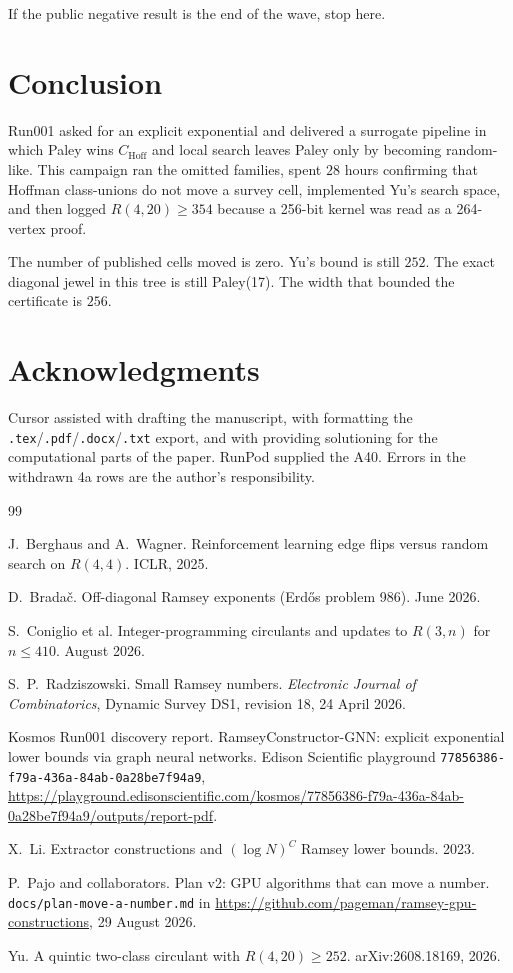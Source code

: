\documentclass[11pt,a4paper]{article}
\begin{document}
If the public negative result is the end of the wave, stop here.

\section{Conclusion}

Run001 asked for an explicit exponential and delivered a surrogate
pipeline in which Paley wins $C_{\mathrm{Hoff}}$ and local search
leaves Paley only by becoming random-like. This campaign ran the
omitted families, spent $28$ hours confirming that Hoffman class-unions
do not move a survey cell, implemented Yu's search space, and then
logged $R(4,20)\ge 354$ because a 256-bit kernel was read as a
264-vertex proof.

The number of published cells moved is zero. Yu's bound is still $252$.
The exact diagonal jewel in this tree is still Paley(17). The width
that bounded the certificate is $256$.

\section*{Acknowledgments}

Cursor assisted with drafting the manuscript, with formatting the
\texttt{.tex}/\texttt{.pdf}/\texttt{.docx}/\texttt{.txt} export, and
with providing solutioning for the computational parts of the paper.
RunPod supplied the A40. Errors in the withdrawn 4a rows are the
author's responsibility.

\begin{thebibliography}{99}

J.~Berghaus and A.~Wagner.
Reinforcement learning edge flips versus random search on $R(4,4)$.
ICLR, 2025.

D.~Brada\v{c}.
Off-diagonal Ramsey exponents (Erd\H{o}s problem 986).
June 2026.

S.~Coniglio et al.
Integer-programming circulants and updates to $R(3,n)$ for $n\le 410$.
August 2026.

S.~P.~Radziszowski.
Small Ramsey numbers.
\textit{Electronic Journal of Combinatorics}, Dynamic Survey DS1,
revision 18, 24 April 2026.

Kosmos Run001 discovery report.
RamseyConstructor-GNN: explicit exponential lower bounds via graph
neural networks.
Edison Scientific playground
\texttt{77856386-f79a-436a-84ab-0a28be7f94a9},
\url{https://playground.edisonscientific.com/kosmos/77856386-f79a-436a-84ab-0a28be7f94a9/outputs/report-pdf}.

X.~Li.
Extractor constructions and $(\log N)^C$ Ramsey lower bounds.
2023.

P.~Pajo and collaborators.
Plan v2: GPU algorithms that can move a number.
\texttt{docs/plan-move-a-number.md} in
\url{https://github.com/pageman/ramsey-gpu-constructions},
29 August 2026.

Yu.
A quintic two-class circulant with $R(4,20)\ge 252$.
arXiv:2608.18169, 2026.

\end{thebibliography}
\end{document}
